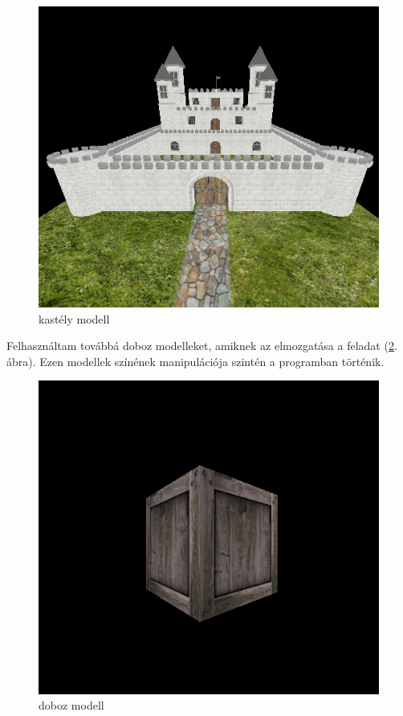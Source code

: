 \begin{figure}[htp]
    \centering
   	\includegraphics[scale=0.7]{images/castle.png}
	\caption{kastély modell}
	\label{fig:castle}
\end{figure}

Felhasználtam továbbá doboz modelleket, amiknek az elmozgatása a feladat (\ref{fig:box}. ábra). Ezen modellek színének manipulációja szintén a programban történik.

\begin{figure}[htp]
    \centering
   	\includegraphics[scale=0.5]{images/box.png}
	\caption{doboz modell}
	\label{fig:box}
\end{figure}

